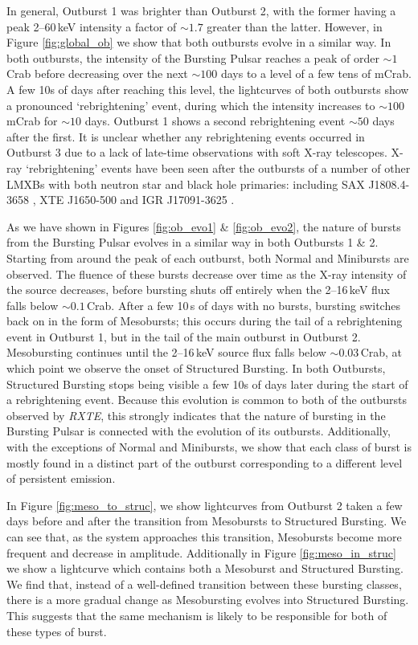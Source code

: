 \par In general, Outburst 1 was brighter than Outburst 2, with the former having a peak 2--60\,keV intensity a factor of $\sim1.7$ greater than the latter.  However, in Figure \ref{fig:global_ob} we show that both outbursts evolve in a similar way.  In both outbursts, the intensity of the Bursting Pulsar reaches a peak of order $\sim1$\,Crab before decreasing over the next $\sim100$ days to a level of a few tens of mCrab.  A few 10s of days after reaching this level, the lightcurves of both outbursts show a pronounced `rebrightening' event, during which the intensity increases to $\sim100$\,mCrab for $\sim10$ days.  Outburst 1 shows a second rebrightening event $\sim50$ days after the first.  It is unclear whether any rebrightening events occurred in Outburst 3 due to a lack of late-time observations with soft X-ray telescopes.  X-ray `rebrightening' events have been seen after the outbursts of a number of other LMXBs with both neutron star and black hole primaries: including SAX J1808.4-3658 \citep{Wijnands_1808}, XTE J1650-500 \citep{Tomsick_MiniOutbursts} and IGR J17091-3625 \citep{Court_IGRClasses}.
\par As we have shown in Figures \ref{fig:ob_evo1} \& \ref{fig:ob_evo2}, the nature of bursts from the Bursting Pulsar evolves in a similar way in both Outbursts 1 \& 2.  Starting from around the peak of each outburst, both Normal and Minibursts are observed.  The fluence of these bursts decrease over time as the X-ray intensity of the source decreases, before bursting shuts off entirely when the 2--16\,keV flux falls below $\sim0.1$\,Crab.  After a few 10\,s of days with no bursts, bursting switches back on in the form of Mesobursts; this occurs during the tail of a rebrightening event in Outburst 1, but in the tail of the main outburst in Outburst 2.  Mesobursting continues until the 2--16\,keV source flux falls below $\sim0.03$\,Crab, at which point we observe the onset of Structured Bursting.  In both Outbursts, Structured Bursting stops being visible a few 10s of days later during the start of a rebrightening event.  Because this evolution is common to both of the outbursts observed by \textit{RXTE}, this strongly indicates that the nature of bursting in the Bursting Pulsar is connected with the evolution of its outbursts.  Additionally, with the exceptions of Normal and Minibursts, we show that each class of burst is mostly found in a distinct part of the outburst corresponding to a different level of persistent emission.
\par In Figure \ref{fig:meso_to_struc}, we show lightcurves from Outburst 2 taken a few days before and after the transition from Mesobursts to Structured Bursting.  We can see that, as the system approaches this transition, Mesobursts become more frequent and decrease in amplitude.  Additionally in Figure \ref{fig:meso_in_struc} we show a lightcurve which contains both a Mesoburst and Structured Bursting.  We find that, instead of a well-defined transition between these bursting classes, there is a more gradual change as Mesobursting evolves into Structured Bursting.  This suggests that the same mechanism is likely to be responsible for both of these types of burst.
